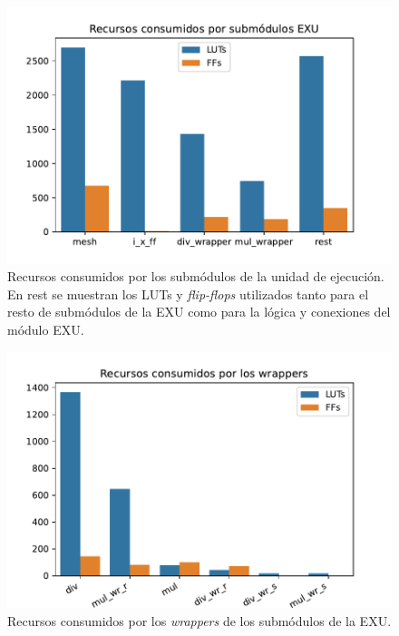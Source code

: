 \begin{figure}[p]
    \centering
    \includegraphics[width=13cm]{images/plots/swerv_exu.pdf}
    \caption[Recursos consumidos por los submódulos de la unidad de ejecución.]{Recursos consumidos por los submódulos de la unidad de ejecución. En rest se muestran los LUTs y \textit{flip-flops} utilizados tanto para el resto de submódulos de la EXU como para la lógica y conexiones del módulo EXU.}
    \label{fig:plots_area_exu}
\end{figure}

\begin{figure}[p]
    \centering
    \includegraphics[width=13cm]{images/plots/swerv_wrappers.pdf}
    \caption[Recursos consumidos por los \textit{wrappers} de los submódulos de la EXU.]{Recursos consumidos por los \textit{wrappers} de los submódulos de la EXU.}
    \label{fig:plots_area_wrappers}
\end{figure}

